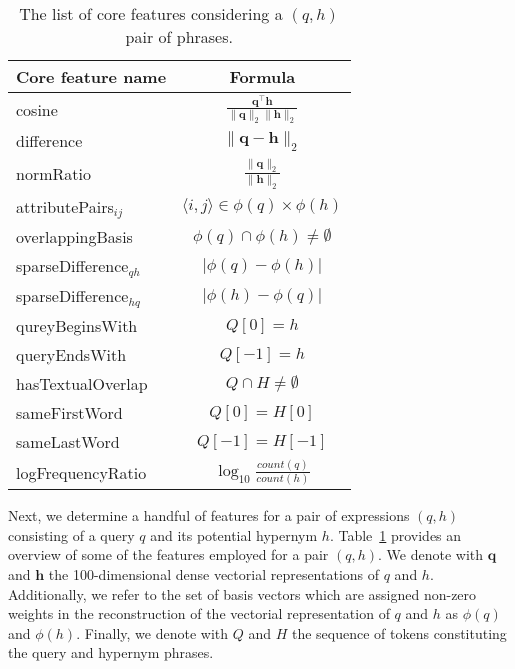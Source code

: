 \documentclass[11pt,a4paper]{article}
\begin{document}
\begin{table}
	\begin{tabular}{lc}
    \toprule
		Core feature name   & Formula \\  
    \midrule
		{cosine}            & $\frac{\mathbf{q}^\intercal \mathbf{h}}{\lVert \mathbf{q} \rVert_2\lVert \mathbf{h} \rVert_2}$ \\ %
		{difference}        & $\lVert \mathbf{q} - \mathbf{h} \rVert_2$ \\ %
		{normRatio}         & $\frac{\lVert \mathbf{q}\rVert_2}{\lVert \mathbf{h} \rVert_2}$ \\ %
    \midrule
    attributePairs$_{ij}$      & $\langle i,j\rangle\in\phi(q)\times\phi(h)$ \\ %
		{overlappingBasis}  & $\phi(q) \cap \phi(h) \neq \emptyset$ \\ %
		{sparseDifference$_{qh}$} & $\lvert \phi(q) - \phi(h) \rvert$ \\ %
		{sparseDifference$_{hq}$} & $\lvert \phi(h) - \phi(q) \rvert$ \\
    \midrule
		{qureyBeginsWith}   & $Q[0] = h$ \\ %
		{queryEndsWith}     & $Q[-1] = h$ \\
		{hasTextualOverlap} & $Q \cap H \neq \emptyset$ \\ %
		{sameFirstWord}        & $Q[0] = H[0]$ \\ %
		{sameLastWord}        & $Q[-1] = H[-1]$ \\
		{logFrequencyRatio} & $\log_{10}\frac{count(q)}{count(h)}$ \\ %
    \bottomrule
	\end{tabular}
	\caption{The list of core features considering a $(q,h)$ pair of phrases.}
	\label{table:core_features}
\end{table} 

Next, we determine a handful of features for a pair of expressions $(q, h)$
consisting of a query $q$ and its potential hypernym $h$. 
Table~\ref{table:core_features} provides an overview of some of the features
employed for a pair $(q, h)$. 
We denote with $\mathbf{q}$ and $\mathbf{h}$ the 100-dimensional dense
vectorial representations of $q$ and $h$.
Additionally, we refer to the set of basis vectors which are assigned non-zero
weights in the reconstruction of the vectorial representation of $q$ and $h$ as
$\phi(q)$ and $\phi(h)$.  
Finally, we denote with $Q$ and $H$ the sequence of tokens constituting the
query and hypernym phrases.
 
\end{document}
